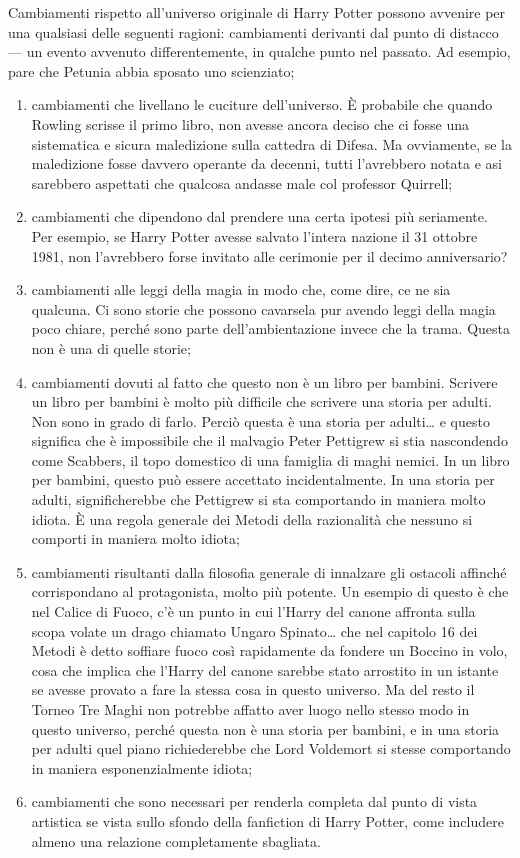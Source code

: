 Cambiamenti rispetto all’universo originale di Harry Potter possono avvenire per una qualsiasi delle seguenti ragioni:
cambiamenti derivanti dal punto di distacco — un evento avvenuto differentemente, in qualche punto nel passato. Ad esempio, pare che Petunia abbia sposato uno scienziato;
\begin{enumerate}
\item cambiamenti che livellano le cuciture dell’universo. È probabile che quando Rowling scrisse il primo libro, non avesse ancora deciso che ci fosse una sistematica e sicura maledizione sulla cattedra di Difesa. Ma ovviamente, se la maledizione fosse davvero operante da decenni, tutti l’avrebbero notata e asi sarebbero aspettati che qualcosa andasse male col professor Quirrell;
\item cambiamenti che dipendono dal prendere una certa ipotesi più seriamente. Per esempio, se Harry Potter avesse salvato l’intera nazione il 31 ottobre 1981, non l’avrebbero forse invitato alle cerimonie per il decimo anniversario?
\item cambiamenti alle leggi della magia in modo che, come dire, ce ne sia qualcuna. Ci sono storie che possono cavarsela pur avendo leggi della magia poco chiare, perché sono parte dell’ambientazione invece che la trama. Questa non è una di quelle storie;
\item cambiamenti dovuti al fatto che questo non è un libro per bambini. Scrivere un libro per bambini è molto più difficile che scrivere una storia per adulti. Non sono in grado di farlo. Perciò questa è una storia per adulti… e questo significa che è impossibile che il malvagio Peter Pettigrew si stia nascondendo come Scabbers, il topo domestico di una famiglia di maghi nemici. In un libro per bambini, questo può essere accettato incidentalmente. In una storia per adulti, significherebbe che Pettigrew si sta comportando in maniera molto idiota. È una regola generale dei Metodi della razionalità che nessuno si comporti in maniera molto idiota;
\item cambiamenti risultanti dalla filosofia generale di innalzare gli ostacoli affinché corrispondano al protagonista, molto più potente. Un esempio di questo è che nel Calice di Fuoco, c’è un punto in cui l’Harry del canone affronta sulla scopa volate un drago chiamato Ungaro Spinato… che nel capitolo 16 dei Metodi è detto soffiare fuoco così rapidamente da fondere un Boccino in volo, cosa che implica che l’Harry del canone sarebbe stato arrostito in un istante se avesse provato a fare la stessa cosa in questo universo. Ma del resto il Torneo Tre Maghi non potrebbe affatto aver luogo nello stesso modo in questo universo, perché questa non è una storia per bambini, e in una storia per adulti quel piano richiederebbe che Lord Voldemort si stesse comportando in maniera esponenzialmente idiota;
\item cambiamenti che sono necessari per renderla completa dal punto di vista artistica se vista sullo sfondo della fanfiction di Harry Potter, come includere almeno una relazione completamente sbagliata.
\end{enumerate}

